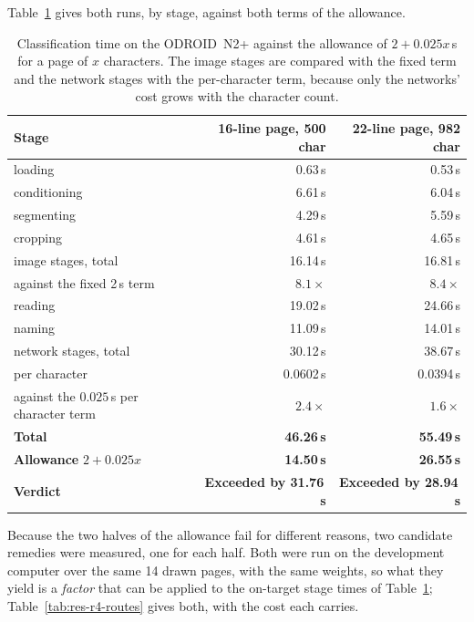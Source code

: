         \medskip

        Table~\ref{tab:res-r4} gives both runs, by stage, against both terms of
        the allowance.

\begin{table}[h]
\centering
\fontsize{10}{12}\selectfont
\begin{tabular}{|l|r|r|}
\hline
\textbf{Stage} & \textbf{16-line page, 500 char} & \textbf{22-line page, 982 char} \\
\hline
loading        &  0.63\,s &  0.53\,s \\
conditioning   &  6.61\,s &  6.04\,s \\
segmenting     &  4.29\,s &  5.59\,s \\
cropping       &  4.61\,s &  4.65\,s \\
\hline
image stages, total & 16.14\,s & 16.81\,s \\
against the fixed 2\,s term & $8.1\times$ & $8.4\times$ \\
\hline
reading        & 19.02\,s & 24.66\,s \\
naming         & 11.09\,s & 14.01\,s \\
\hline
network stages, total & 30.12\,s & 38.67\,s \\
per character & 0.0602\,s & 0.0394\,s \\
against the $0.025\,$s per character term & $2.4\times$ & $1.6\times$ \\
\hline
\textbf{Total} & \textbf{46.26\,s} & \textbf{55.49\,s} \\
\textbf{Allowance} $2+0.025x$ & \textbf{14.50\,s} & \textbf{26.55\,s} \\
\textbf{Verdict} & \textbf{Exceeded by 31.76\,s} & \textbf{Exceeded by 28.94\,s} \\
\hline
\end{tabular}
\caption{Classification time on the ODROID~N2+ against the allowance of
$2+0.025x$\,s for a page of $x$ characters. The image stages are compared with
the fixed term and the network stages with the per-character term, because only
the networks' cost grows with the character count.}
\label{tab:res-r4}
\end{table}

        Because the two halves of the allowance fail for different reasons, two
        candidate remedies were measured, one for each half. Both were run on
        the development computer over the same 14 drawn pages, with the same
        weights, so what they yield is a \emph{factor} that can be applied to
        the on-target stage times of Table~\ref{tab:res-r4};
        Table~\ref{tab:res-r4-routes} gives both, with the cost each carries.


